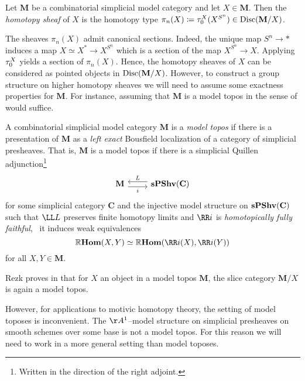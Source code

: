 \begin{definition}
  Let \(\mathbf M\) be a combinatorial simplicial model category and let
  \(X\in\mathbf M\). Then the \emph{ homotopy sheaf} of \(X\) is the
  homotopy type \(\pi_{n}(X)\coloneqq\tau_{0}^{X}(X^{S^{n}})\in\operatorname{\textnormal{Disc}}(\mathbf
  M/X)\).
\end{definition}

The sheaves \(\pi_{n}(X)\) admit canonical sections. Indeed, the unique map
\(S^{n}\to *\) induces a map \(X\simeq X^{*}\to X^{S^{n}}\) which is a section
of the map \(X^{S^{n}}\to X\). Applying \(\tau_{0}^{X}\) yields a section of
\(\pi_{n}(X)\). Hence, the homotopy sheaves of \(X\) can be considered as
pointed objects in \(\operatorname{\textnormal{Disc}}(\mathbf M/X)\). However, to construct a group
structure on higher homotopy sheaves we will need to assume some exactness
properties for \(\mathbf M\). For instance, assuming that \(\mathbf M\) is a
model topos in the sense of \cite{rezkhomotopytoposes} would suffice.

\begin{definition}\label{defn:model-topos}
  A combinatorial simplicial model category \(\mathbf M\) is a \emph{model
    topos} if there is a presentation of \(\mathbf M\) as a \emph{left exact}
  Bousfield localization of a category of simplicial presheaves. That is,
  \(\mathbf M\) is a model topos if there is a simplicial Quillen
  adjunction\footnote{Written in the direction of the right adjoint.}
  \[
    \begin{tikzcd}
      \mathbf M \arrow[r, shift right=.7ex, "i"'] & \arrow[l, shift right=.7ex,
      "L"'] \spshv(\mathbf C)
    \end{tikzcd}
  \]
  for some simplicial category \(\mathbf C\) and the injective model structure
  on \(\operatorname{\textnormal{\bfseries sPShv}}(\mathbf C)\) such that \(\LL L\) preserves finite homotopy limits
  and \(\RR i\) is \emph{homotopically fully faithful}, \ie~it induces weak
  equivalences
  \[
    \RHom(X, Y)\simeq\RHom(\RR i(X), \RR i(Y))
  \]
  for all \(X,Y\in\mathbf M\).
\end{definition}

Rezk proves in \cite[Corollary~6.10]{rezkhomotopytoposes} that for \(X\) an
object in a model topos \(\mathbf M\), the slice category \(\mathbf M/X\) is
again a model topos.

However, for applications to motivic homotopy theory, the setting of model
toposes is inconvenient. The \(\AA^1\)--model structure on simplicial presheaves
on smooth schemes over some base is not a model topos. For this reason we will
need to work in a more general setting than model toposes.

